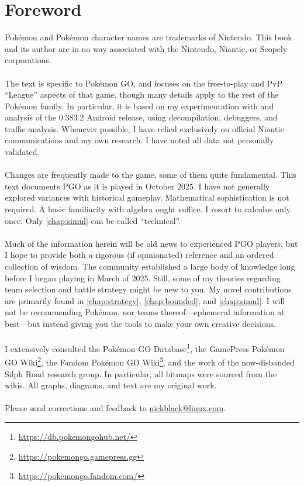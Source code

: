 \clearpage
\chapter{Foreword}

\noindent{}Pokémon and Pokémon character names are trademarks of Nintendo.
This book and its author are in no way associated with the Nintendo, Niantic,
  or Scopely corporations.\\
\\
\noindent{}The text is specific to Pokémon GO, and focuses on the free-to-play and PvP
  ``League'' aspects of that game, though many details
  apply to the rest of the Pokémon family.
In particular, it is based on my experimentation with and analysis of
 the 0.383.2 Android release, using decompilation, debuggers, and
 traffic analysis.
Whenever possible, I have relied exclusively on official Niantic communications
 and my own research.
I have noted all data not personally validated.\\
\\
\noindent{}Changes are frequently made to the game, some of them quite fundamental.
This text documents PGO as it is played in October 2025.
I have not generally explored variances with historical gameplay.
Mathematical sophistication is not required.
A basic familiarity with algebra ought suffice.
I resort to calculus only once.
Only \autoref{chap:simul} can be called ``technical''.\\
\\
\noindent{}Much of the information herein will be old news to experienced
 PGO players, but I hope to provide both a rigorous (if opinionated) reference and an ordered collection of wisdom.
The community established a large body of knowledge long before I
 began playing in March of 2025.
Still, some of my theories regarding team selection and battle strategy might
  be new to you.
My novel contributions are primarily found in \autoref{chap:strategy},
  \autoref{chap:bounded}, and \autoref{chap:simul}.
I will not be recommending Pokémon, nor teams thereof---ephemeral information at best---but
 instead giving you the tools to make your own creative decisions.\\
\\
\noindent{}I extensively consulted the Pokémon GO Database\footnote{\url{https://db.pokemongohub.net/}},
  the GamePress Pokémon GO Wiki\footnote{\url{https://pokemongo.gamepress.gg}},
  the Fandom Pokémon GO Wiki\footnote{\url{https://pokemongo.fandom.com/}},
  and the work of the now-disbanded Silph Road research group.
In particular, all bitmaps were sourced from the wikis.
All graphs, diagrams, and text are my original work.\\
\\
\noindent{}Please send corrections and feedback to 
  \href{mailto:nickblack@linux.com}{nickblack@linux.com}.
